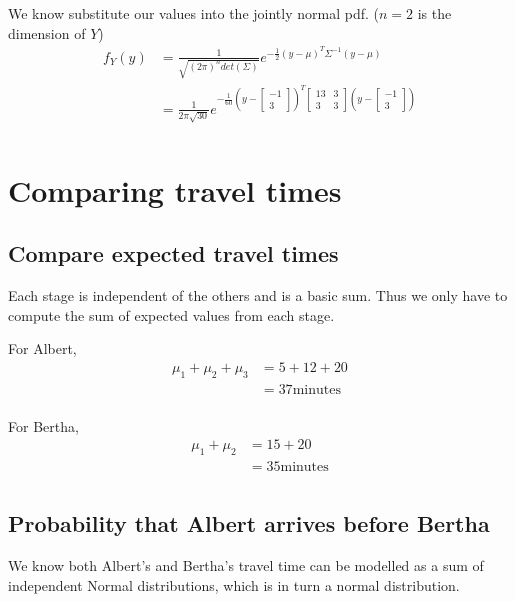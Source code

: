 \documentclass{article}
\begin{document}
We know substitute our values into the jointly normal pdf.
($n=2$ is the dimension of $Y$)
\begin{align*}
    f_Y(y) &= \frac{1}{\sqrt{(2\pi)^n det(\Sigma)}}
    e^{-\frac{1}{2} (y-\mu)^T \Sigma^{-1} (y-\mu)} \\
    &= \frac{1}{2\pi\sqrt{30}}
    e^{-\frac{1}{60} \left(y-\begin{bmatrix} -1 \\ 3 \end{bmatrix}\right)^T
    \begin{bmatrix}
        13 & 3 \\
        3 & 3
    \end{bmatrix} \left(y-\begin{bmatrix} -1 \\ 3 \end{bmatrix}\right)} \\
\end{align*}

\section{Comparing travel times}
\subsection{Compare expected travel times}
Each stage is independent of the others and is a basic sum. Thus we only have
to compute the sum of expected values from each stage.

For Albert,
\begin{align*}
    \mu_1 + \mu_2 + \mu_3 &= 5 + 12 + 20 \\
    &= 37 \text{minutes} \\
\end{align*}

For Bertha,
\begin{align*}
    \mu_1 + \mu_2 &= 15 + 20 \\
    &= 35 \text{minutes} \\
\end{align*}

\subsection{Probability that Albert arrives before Bertha}
We know both Albert's and Bertha's travel time can be modelled as a sum of
independent Normal distributions, which is in turn a normal distribution.
\end{document}
